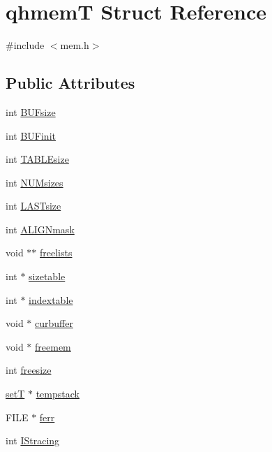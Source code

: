 \hypertarget{structqhmemT}{}\section{qhmem\+T Struct Reference}
\label{structqhmemT}


{\ttfamily \#include $<$mem.\+h$>$}

\subsection*{Public Attributes}
\begin{DoxyCompactItemize}
\item 
int \hyperlink{structqhmemT_a07de198f55a63efa83d3a90226412c7c}{B\+U\+Fsize}
\item 
int \hyperlink{structqhmemT_ac9d8323f69d9391c58e0c069f29c087f}{B\+U\+Finit}
\item 
int \hyperlink{structqhmemT_a4a89c1fc0ec2b7166d6ea8c1be7a8a41}{T\+A\+B\+L\+Esize}
\item 
int \hyperlink{structqhmemT_a014253ea6743f71bf77c0c6abfb9188d}{N\+U\+Msizes}
\item 
int \hyperlink{structqhmemT_afe8e7c0bc8180a6390bc157f7ac6ed63}{L\+A\+S\+Tsize}
\item 
int \hyperlink{structqhmemT_a05b3e3e76465ea220b7c2c576ea4ddb8}{A\+L\+I\+G\+Nmask}
\item 
void $\ast$$\ast$ \hyperlink{structqhmemT_a53bb52801898450f6c20b0f5ac1e30b2}{freelists}
\item 
int $\ast$ \hyperlink{structqhmemT_a25ed198782a5c7ab65ac579903861eaf}{sizetable}
\item 
int $\ast$ \hyperlink{structqhmemT_adbf074c4b6476d8172a59724b7c77126}{indextable}
\item 
void $\ast$ \hyperlink{structqhmemT_ac0b67b548181eb20562099ead1d664cd}{curbuffer}
\item 
void $\ast$ \hyperlink{structqhmemT_abb593367b65eba741ac920d5ceff7009}{freemem}
\item 
int \hyperlink{structqhmemT_aae36946816382f5a7363adfb02f7e07b}{freesize}
\item 
\hyperlink{structsetT}{set\+T} $\ast$ \hyperlink{structqhmemT_a49978efa322d8df410f1ac0daa8ffb12}{tempstack}
\item 
F\+I\+L\+E $\ast$ \hyperlink{structqhmemT_a4b73770cdb21084d639e1008832e6c72}{ferr}
\item 
int \hyperlink{structqhmemT_a9cdf6ca7a33e9e8ada80339d691379c6}{I\+Stracing}
\item 
$$
\end{DoxyCompactItemize}
